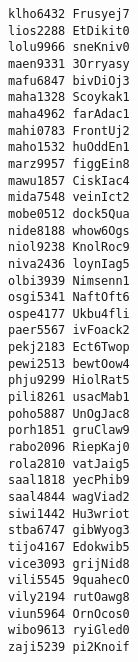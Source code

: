 \documentclass{article}
\begin{document}
    \texttt{klho6432 Frusyej7} \\
    \texttt{lios2288 EtDikit0} \\
    \texttt{lolu9966 sneKniv0} \\
    \texttt{maen9331 3Orryasy} \\
    \texttt{mafu6847 bivDiOj3} \\
    \texttt{maha1328 Scoykak1} \\
    \texttt{maha4962 farAdac1} \\
    \texttt{mahi0783 FrontUj2} \\
    \texttt{maho1532 huOddEn1} \\
    \texttt{marz9957 figgEin8} \\
    \texttt{mawu1857 CiskIac4} \\
    \texttt{mida7548 veinIct2} \\
    \texttt{mobe0512 dock5Qua} \\
    \texttt{nide8188 whow6Ogs} \\
    \texttt{niol9238 KnolRoc9} \\
    \texttt{niva2436 loynIag5} \\
    \texttt{olbi3939 Nimsenn1} \\
    \texttt{osgi5341 NaftOft6} \\
    \texttt{ospe4177 Ukbu4fli} \\
    \texttt{paer5567 ivFoack2} \\
    \texttt{pekj2183 Ect6Twop} \\
    \texttt{pewi2513 bewtOow4} \\
    \texttt{phju9299 HiolRat5} \\
    \texttt{pili8261 usacMab1} \\
    \texttt{poho5887 UnOgJac8} \\
    \texttt{porh1851 gruClaw9} \\
    \texttt{rabo2096 RiepKaj0} \\
    \texttt{rola2810 vatJaig5} \\
    \texttt{saal1818 yecPhib9} \\
    \texttt{saal4844 wagViad2} \\
    \texttt{siwi1442 Hu3wriot} \\
    \texttt{stba6747 gibWyog3} \\
    \texttt{tijo4167 Edokwib5} \\
    \texttt{vice3093 grijNid8} \\
    \texttt{vili5545 9quahecO} \\
    \texttt{vily2194 rutOawg8} \\
    \texttt{viun5964 OrnOcos0} \\
    \texttt{wibo9613 ryiGled0} \\
    \texttt{zaji5239 pi2Knoif} \\
\end{document}

